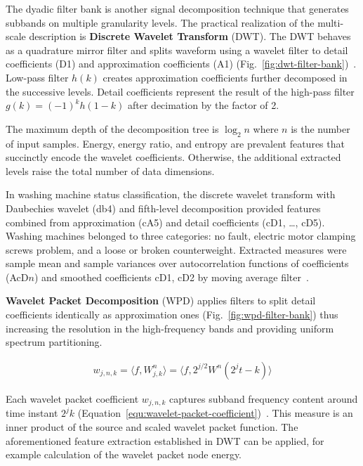 The dyadic filter bank is another signal decomposition technique that generates subbands on multiple granularity levels. The practical realization of the multi-scale description is \textbf{Discrete Wavelet Transform} (DWT). The DWT behaves as a quadrature mirror filter and splits waveform using a wavelet filter to detail coefficients (D1) and approximation coefficients (A1) (Fig.~\ref{fig:dwt-filter-bank})~\cite{nandi_condition_2019}. Low-pass filter $h(k)$ creates approximation coefficients further decomposed in the successive levels. Detail coefficients represent the result of the high-pass filter $g(k) = (-1)^k h(1 - k)$ after decimation by the factor of 2. 

The maximum depth of the decomposition tree is $\log_2{n}$ where $n$ is the number of input samples. Energy, energy ratio, and entropy are prevalent features that succinctly encode the wavelet coefficients. Otherwise, the additional extracted levels raise the total number of data dimensions.

In washing machine status classification, the discrete wavelet transform with Daubechies wavelet (db4) and fifth-level decomposition provided features combined from approximation (cA5) and detail coefficients (cD1, \dots, cD5). Washing machines belonged to three categories: no fault, electric motor clamping screws problem, and a loose or broken counterweight. Extracted measures were sample mean and sample variances over autocorrelation functions of coefficients (AcD$n$) and smoothed coefficients cD1, cD2 by moving average filter~\cite{goumas_classification_2002}.

\textbf{Wavelet Packet Decomposition} (WPD) applies filters to split detail coefficients identically as approximation ones (Fig.~\ref{fig:wpd-filter-bank}) thus increasing the resolution in the high-frequency bands and providing uniform spectrum partitioning. 

\begin{ceqn}\begin{align}
 w_{j,n,k} = \langle f, W_{j,k}^n\rangle = \langle f, 2^{j/2} W^n (2^jt-k) \rangle
\label{equ:wavelet-packet-coefficient}
\end{align}\end{ceqn}

Each wavelet packet coefficient $w_{j,n,k}$ captures subband frequency content around time instant $2^j k$ (Equation~\ref{equ:wavelet-packet-coefficient})~\cite{yen_wavelet_2000}. This measure is an inner product of the source and scaled wavelet packet function. The aforementioned feature extraction established in DWT can be applied, for example calculation of the wavelet packet node energy.

